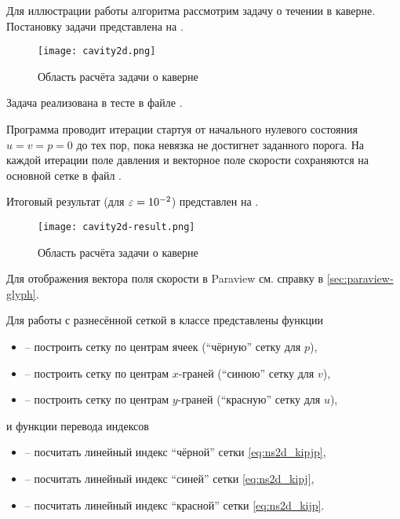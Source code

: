 Для иллюстрации работы алгоритма рассмотрим задачу о 
течении в каверне. Постановку задачи представлена на .

\begin{figure}[h]
\centering
\texttt{[image: cavity2d.png]}
\caption{Область расчёта задачи о каверне}
\label{fig:cavity}
\end{figure}

Задача реализована в тесте  в файле .

Программа проводит итерации стартуя от начального нулевого состояния
$u=v=p=0$ до тех пор, пока невязка не достигнет заданного порога.
На каждой итерации поле давления и векторное поле скорости сохраняются
на основной сетке в файл .

Итоговый результат (для $\varepsilon=10^{-2}$) представлен на .

\begin{figure}[h]
\centering
\texttt{[image: cavity2d-result.png]}
\caption{Область расчёта задачи о каверне}
\label{fig:cavity-result}
\end{figure}

Для отображения вектора поля скорости в Paraview см. справку в \ref{sec:paraview-glyph}.

Для работы с разнесённой сеткой в классе 
представлены функции
\begin{itemize}
\item {}  -- построить сетку по центрам ячеек (``чёрную'' сетку для $p$),
\item {} -- построить сетку по центрам $x$-граней (``синюю'' сетку для $v$),
\item {} -- построить сетку по центрам $y$-граней (``красную'' сетку для $u$),
\end{itemize}

и функции перевода индексов
\begin{itemize}
\item {} -- посчитать линейный индекс ``чёрной'' сетки \eqref{eq:ns2d_kipjp},
\item {} -- посчитать линейный индекс ``синей'' сетки \eqref{eq:ns2d_kipj},
\item {} -- посчитать линейный индекс ``красной'' сетки \eqref{eq:ns2d_kijp}.
\end{itemize}

